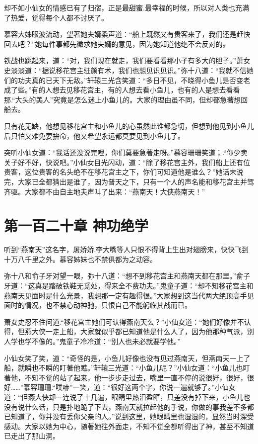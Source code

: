 \documentclass[12pt,oneside]{book}
\begin{document}
却不如小仙女的情感已有了归宿，正是最甜蜜.最幸福的时候，所以对人类也充满了热爱，觉得每个人都不讨厌了。

慕容大姊眼波流动，望著她夫婿柔声道：``船上既然又有贵客来了，我们还是赶快回去吧？''她每件事都先徵求她夫婿的意见，因为她知道他绝不会反对的。

铁战也跳起来，道：``对，我们现在就走，我们要看看那小子有多大的胆子。''萧女史淡淡道：``据说移花宫主驻颜有术，我们也想见识见识。''弥十八道：``我就不信她们的功夫真的已天下无敌。''轩辕三光含笑道：``多日不见，不晓得小鱼儿是否变老成了些。''有的人想去见移花宫主，有的人想去看小鱼儿，也有的人是想去看看那.``大头的美人''究竟是怎么迷上小鱼儿的。大家的理由虽不同，但却都急著想回船去。

只有花无缺，他想见移花宫主和小鱼儿的心虽然此谁都急切，但想到他见到小鱼儿后只怕又难免要拚命，他又希望永远都莫要见到小鱼儿了。

突听小仙女道：``我话还没说完哩，你们莫要急著走呀。''慕容珊珊笑道；.``你少卖关子好不好，快说吧。''小仙女目光闪动，道：``除了移花宫主外，我们船上还有位贵客，这位贵客的名头绝不在移花宫主之下，你们可知道他是谁么？''她话末说完，大家已全都猜出是谁了，因为普天之下，只有一个人的声名能和移花宫主并驾齐驱。大家都不由自主地夫声叫了出来：``燕南天！大侠燕南天！''

\hypertarget{ux7b2cux4e00ux767eux4e8cux5341ux7ae0-ux795eux529fux7eddux5b66}{%
\chapter{第一百二十章
神功绝学}\label{ux7b2cux4e00ux767eux4e8cux5341ux7ae0-ux795eux529fux7eddux5b66}}

听到``燕南天''这名字，屠娇娇.李大嘴等人只恨不得背上生出对翅膀来，快快飞到十万八千里之外。慕容姊妹也不禁俱都为之动容。

弥十八和俞子牙对望一眼，弥十八道：``想不到移花宫主和燕南天都在那里。''俞子牙道：``这真是踏破铁鞋无觅处，得来全不费功夫。''鬼童子道：``却不知移花宫主和燕南天见面时是什么光景，我想那一定有趣得很。''大家想到这当代两大绝顶高手见面时的情况，也不禁心动神驰，只恨自己不能躬临其战而已。

萧女史忍不住问道.``移花宫主她们可认得燕南天么？''小仙女道：``她们好像并不认得，但燕大侠一走上船，大家就似乎都已知道他是什么人了，因为他那种气派，别人学也学不像的。''鬼童子冷冷道：``别人也未必就要学他。''

小仙女笑了笑，道：``奇怪的是，小鱼儿好像也没有见过燕南天，但燕南天一上了船，就瞬也不瞬的盯著他瞧。''轩辕三光道：``小鱼儿呢？''小仙女道：``小鱼儿也盯著他，不知不觉的站了起来，他一步步走过去，嘴里一直不停的说很好，很好，很好\ldots\ldots{}''慕容珊珊.``噗哧''一笑，道：``很好这两个字，你说一遍就够了。''小仙女道：``但燕大侠却一连说了十几遍，眼睛里热泪盈眶，只差没有掉下来，小鱼儿也没有说什么话，只是扑地跪了下去，燕南天就拉起他的手说，你做的事我差不多都已知道了，你并没有丢你父亲的人。''说到这里，她眼睛里也湿湿的，显然当时深受感动。大家以她为中心，随著她往外面走，不知不觉全都听得出了神，甚至不知道已走出了那山洞。
\end{document}
